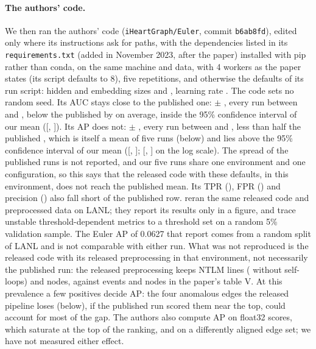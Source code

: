 \documentclass[11pt,a4paper]{article}
\begin{document}
\paragraph{The authors' code.} We then ran the authors' code (\texttt{iHeartGraph/Euler}, commit \texttt{b6ab8fd}), edited only where its instructions ask for paths, with the dependencies listed in its \texttt{requirements.txt} (added in November 2023, after the paper) installed with pip rather than conda, on the same machine and data, with 4 workers as the paper states (its script defaults to 8), five repetitions, and otherwise the defaults of its run script: hidden and embedding sizes \EulerAuthorsHidden{} and \EulerAuthorsZdim{}, learning rate \EulerAuthorsLr{}. The code sets no random seed. Its AUC stays close to the published one: \EulerAuthorsAuc{} $\pm$ \EulerAuthorsAucSd{}, every run between \EulerAuthorsAucMin{} and \EulerAuthorsAucMax{}, below the published \EulerPublishedAuc{} by \EulerAuthorsAucGap{} on average, inside the 95\% confidence interval of our mean ([\EulerAuthorsAucMeanLow{}, \EulerAuthorsAucMeanHigh{}]). Its AP does not: \EulerAuthorsAp{} $\pm$ \EulerAuthorsApSd{}, every run between \EulerAuthorsApMin{} and \EulerAuthorsApMax{}, less than half the published \EulerPublishedAp{}, which is itself a mean of five runs (below) and lies above the 95\% confidence interval of our mean ([\EulerAuthorsApMeanLow{}, \EulerAuthorsApMeanHigh{}]; [\EulerAuthorsApLogMeanLow{}, \EulerAuthorsApLogMeanHigh{}] on the log scale). The spread of the published runs is not reported, and our five runs share one environment and one configuration, so this says that the released code with these defaults, in this environment, does not reach the published mean. Its TPR (\EulerAuthorsTpr{}), FPR (\EulerAuthorsFpr{}) and precision (\EulerAuthorsPrecision{}) also fall short of the published row. \textcite{wang2025rr} reran the same released code and preprocessed data on LANL; they report its results only in a figure, and trace unstable threshold-dependent metrics to a threshold set on a random 5\% validation sample. The Euler AP of 0.0627 that \textcite{king2026cybergfm} report comes from a random split of LANL and is not comparable with either run. What was not reproduced is the released code with its released preprocessing in that environment, not necessarily the published run: the released preprocessing keeps \EulerAuthorsNtlmLines{} NTLM lines (\EulerAuthorsNtlmNoLoops{} without self-loops) and \EulerAuthorsNodes{} nodes, against \EulerPublishedEvents{} events and \EulerPublishedNodes{} nodes in the paper's table V. At this prevalence a few positives decide AP: the four anomalous edges the released pipeline loses (below), if the published run scored them near the top, could account for most of the gap. The authors also compute AP on float32 scores, which saturate at the top of the ranking, and on a differently aligned edge set; we have not measured either effect.
\end{document}
